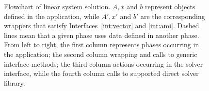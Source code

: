 \documentclass[acmtocl]{acmtrans2m}
\begin{document}
\begin{figure}
\begin{center}
\end{center}
\caption{Flowchart of linear system solution. $A, x$ and $b$ represent objects
  defined in the application, while $A', x'$ and $b'$ are the corresponding 
    wrappers that
    satisfy Interfaces~\ref{int:vector} and \ref{int:ami}. Dashed lines mean
    that a given phase uses data defined in another phase. From left to right,
  the first column 
    represents phases occurring in the application; the second column wrapping
and calls to generic interface methods; the third column actions
occurring in the solver interface, while the fourth column calls to supported
direct solver library.}
\label{fig:flowchart}
\end{figure}
\end{document}
